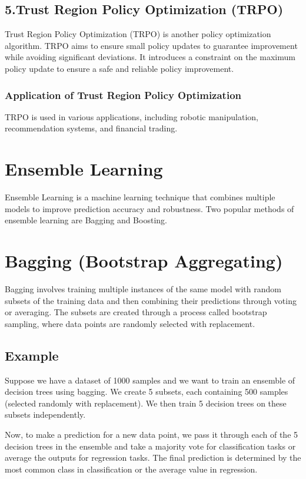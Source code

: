 \documentclass{article}
\begin{document}
\subsection{5.Trust Region Policy Optimization (TRPO)}
Trust Region Policy Optimization (TRPO) is another policy optimization algorithm. TRPO aims to ensure small policy updates to guarantee improvement while avoiding significant deviations. It introduces a constraint on the maximum policy update to ensure a safe and reliable policy improvement.

\subsubsection{Application of Trust Region Policy Optimization}
TRPO is used in various applications, including robotic manipulation, recommendation systems, and financial trading.

\section{Ensemble Learning}
Ensemble Learning is a machine learning technique that combines multiple models to improve prediction accuracy and robustness. Two popular methods of ensemble learning are Bagging and Boosting.

\section{Bagging (Bootstrap Aggregating)}
Bagging involves training multiple instances of the same model with random subsets of the training data and then combining their predictions through voting or averaging. The subsets are created through a process called bootstrap sampling, where data points are randomly selected with replacement.

\subsection{Example}
Suppose we have a dataset of 1000 samples and we want to train an ensemble of decision trees using bagging. We create 5 subsets, each containing 500 samples (selected randomly with replacement). We then train 5 decision trees on these subsets independently.

Now, to make a prediction for a new data point, we pass it through each of the 5 decision trees in the ensemble and take a majority vote for classification tasks or average the outputs for regression tasks. The final prediction is determined by the most common class in classification or the average value in regression.
\end{document}
